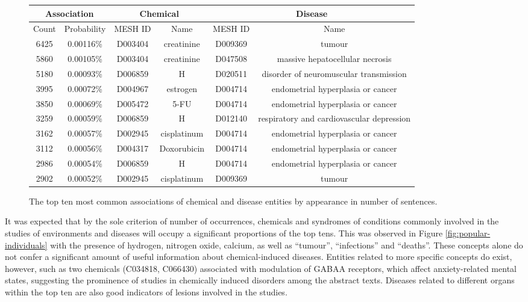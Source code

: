 \documentclass[10pt, oneside]{article}
\begin{document}
\begin{figure}[h]
\begin{center}
\fontsize{9}{11}\selectfont
\begin{tabular}{|*{6}{c|}}\hline
\multicolumn{2}{|c|}{\textbf{Association}} & \multicolumn{2}{c|}{\textbf{Chemical}} & \multicolumn{2}{c|}{\textbf{Disease}} \\ \hline 
Count & Probability & MESH ID & Name & MESH ID & Name \\ \hline 
6425 & 0.00116\% & D003404 & creatinine & D009369 & tumour \\ \hline
5860 & 0.00105\% & D003404 & creatinine & D047508 & massive hepatocellular necrosis \\ \hline
5180 & 0.00093\% & D006859 & H & D020511 & disorder of neuromuscular transmission \\ \hline
3995 & 0.00072\% & D004967 & estrogen & D004714 & endometrial hyperplasia or cancer \\ \hline
3850 & 0.00069\% & D005472 & 5-FU & D004714 & endometrial hyperplasia or cancer \\ \hline
3259 & 0.00059\% & D006859 & H & D012140 & respiratory and cardiovascular depression \\ \hline
3162 & 0.00057\% & D002945 & cisplatinum & D004714 & endometrial hyperplasia or cancer \\ \hline
3112 & 0.00056\% & D004317 & Doxorubicin & D004714 & endometrial hyperplasia or cancer \\ \hline
2986 & 0.00054\% & D006859 & H & D004714 & endometrial hyperplasia or cancer \\ \hline
2902 & 0.00052\% & D002945 & cisplatinum & D009369 & tumour \\ \hline
\end{tabular}
\caption{\label{fig:popular-pairs} The top ten most common associations of chemical and disease entities by appearance in number of sentences.}
\end{center}
\end{figure}

It was expected that by the sole criterion of number of occurrences, chemicals and syndromes of conditions commonly involved in the studies of environments and diseases will occupy a significant proportions of the top tens. This was observed in Figure \ref{fig:popular-individuals} with the presence of hydrogen, nitrogen oxide, calcium, as well as ``tumour'', ``infections'' and ``deaths''. These concepts alone do not confer a significant amount of useful information about chemical-induced diseases. Entities related to more specific concepts do exist, however, such as two chemicals (C034818, C066430) associated with modulation of GABAA receptors, which affect anxiety-related mental states, suggesting the prominence of studies in chemically induced disorders among the abstract texts. Diseases related to different organs within the top ten are also good indicators of lesions involved in the studies.
\end{document}
